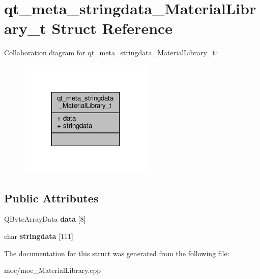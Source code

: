 \hypertarget{structqt__meta__stringdata___material_library__t}{\section{qt\-\_\-meta\-\_\-stringdata\-\_\-\-Material\-Library\-\_\-t Struct Reference}
\label{structqt__meta__stringdata___material_library__t}
}


Collaboration diagram for qt\-\_\-meta\-\_\-stringdata\-\_\-\-Material\-Library\-\_\-t\-:
\nopagebreak
\begin{figure}[H]
\begin{center}
\leavevmode
\includegraphics[width=180pt]{structqt__meta__stringdata___material_library__t__coll__graph}
\end{center}
\end{figure}
\subsection*{Public Attributes}
\begin{DoxyCompactItemize}
\item 
\hypertarget{structqt__meta__stringdata___material_library__t_ad8004582a5313e450c6cf5e4fe45c873}{Q\-Byte\-Array\-Data {\bfseries data} \mbox{[}8\mbox{]}}\label{structqt__meta__stringdata___material_library__t_ad8004582a5313e450c6cf5e4fe45c873}

\item 
\hypertarget{structqt__meta__stringdata___material_library__t_a43333f97aa1fd38ca1dca2ae23a2ddcd}{char {\bfseries stringdata} \mbox{[}111\mbox{]}}\label{structqt__meta__stringdata___material_library__t_a43333f97aa1fd38ca1dca2ae23a2ddcd}

\end{DoxyCompactItemize}


The documentation for this struct was generated from the following file\-:\begin{DoxyCompactItemize}
\item 
moc/moc\-\_\-\-Material\-Library.\-cpp\end{DoxyCompactItemize}
